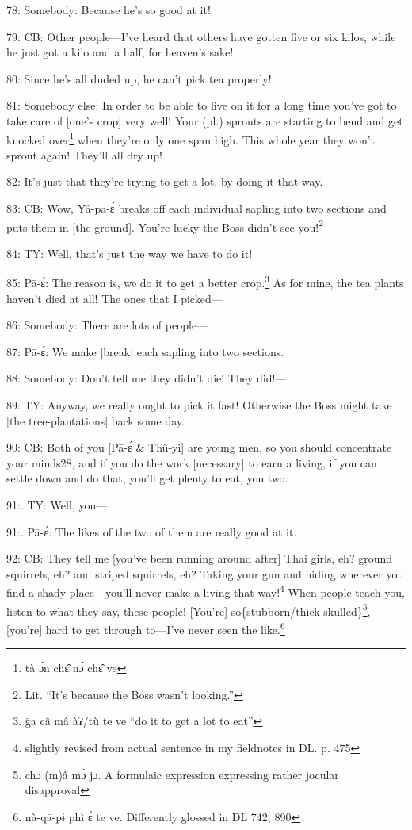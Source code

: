 78: Somebody: Because he's so good at it!

79: CB: Other people---I've heard that others have gotten five or six kilos, while
he just got a kilo and a half, for heaven's sake!

80: Since he's all duded up, he can't pick tea properly!

81: Somebody else: In order to be able to live on it for a long time you've got
to take care of [one's crop] very well!  Your (pl.) sprouts are starting to bend
and get knocked over\footnote{tà ɔ́n chɛ̂ nɔ́ chɛ̂ ve} when they're only one span high.  This whole year they
won't sprout again!  They'll all dry up!

82: It's just that they're trying to get a lot, by doing it that way.

83: CB: Wow, Yâ-pā-ɛ́\textit{ }breaks off each individual sapling into two
sections and puts them in [the ground].  You're lucky the Boss didn't see you!\footnote{Lit. ``It's because the Boss wasn't looking.''}

84: TY: Well, that's just the way we have to do it!

85: Pā-ɛ́: The reason is, we do it to get a better crop.\footnote{g̈a câ mâ àʔ/tù te ve ``do it to get a lot to eat''}  As for mine,
the tea plants haven't died at all!  The ones that I picked---

86: Somebody: There are lots of people---

87: Pā-ɛ́: We make [break] each sapling into two sections.

88: Somebody: Don't tell me they didn't die!  They did!---

89: TY: Anyway, we really ought to pick it fast!  Otherwise the Boss might take
[the tree-plantations] back some day.

90: CB: Both of you [Pā-ɛ́ \& Thû-yì] are young men, so you should concentrate
your minds28, and if you do the work [necessary] to earn a living, if you can settle
down and do that, you'll get plenty to eat, you two.

91:. TY: Well, you---

91:. Pā-ɛ́: The likes of the two of them are really good at it.

92: CB: They tell me [you've been running around after] Thai girls, eh? ground
squirrels, eh? and striped squirrels, eh? Taking your gun and hiding wherever you
find a shady place---you'll never make a living that way!\footnote{slightly revised from actual sentence in my fieldnotes in DL. p. 475}  When people teach
you, listen to what they say, these people!  [You're] so\{stubborn/thick-skulled\}\footnote{chɔ (m)â mɔ̀ jɔ. A formulaic expression expressing rather jocular disapproval},
[you're] hard to get through to---I've never seen the like.\footnote{nà-qā-pɨ phì ɛ̀ te ve.  Differently glossed in DL 742, 890}

